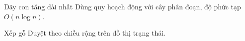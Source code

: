 \begin{tutorial}{Dãy con tăng dài nhất}
Dùng quy hoạch động với cây phân đoạn, độ phức tạp $O(n \log n)$.
\end{tutorial}

\begin{tutorial}{Xếp gỗ}
Duyệt theo chiều rộng trên đồ thị trạng thái.
\end{tutorial}
